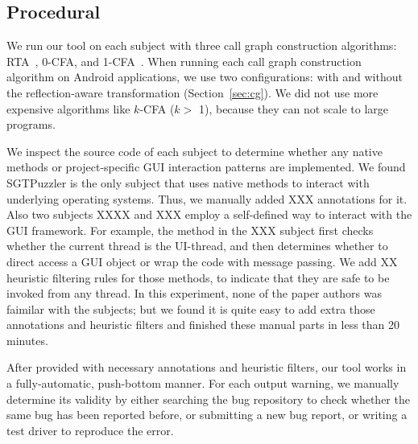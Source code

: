 \subsection{Procedural}
\label{sec:procedural}

We run our tool on each subject with three call graph construction
algorithms: RTA~\cite{rta}, 0-CFA, and 1-CFA~\cite{kcfa}.  When running
each call graph construction algorithm on Android applications, we
use two configurations: with and without the reflection-aware transformation
(Section~\ref{sec:cg}).  We did not use more expensive algorithms like $k$-CFA ($k >$ 1),
because they can not scale to large programs.

We inspect the source code of each subject to determine whether any
native methods or project-specific GUI interaction patterns are implemented.
We found SGTPuzzler is the only subject that uses native methods to interact with
underlying operating systems. Thus, we manually added XXX 
annotations for it. Also two subjects XXXX and XXX employ a self-defined
way to interact with the GUI framework. For example, the 
method in the XXX subject first checks whether the current thread is the UI-thread, and
then determines whether to direct access a GUI object or wrap the code with
message passing. We add XX heuristic filtering rules for those methods, to indicate
that they are safe to be invoked from any thread. In this experiment, none of the paper
authors was faimilar with the subjects; but we found it is quite easy
to add extra those annotations and heuristic filters and finished these
manual parts in less than 20 minutes.

After provided with necessary annotations and heuristic filters,
our tool works in a fully-automatic, push-bottom manner. For each output
warning, we manually determine its validity by either searching the
bug repository to check whether the same bug has been reported before,
or submitting a new bug report, or writing a test driver to reproduce
the error.



